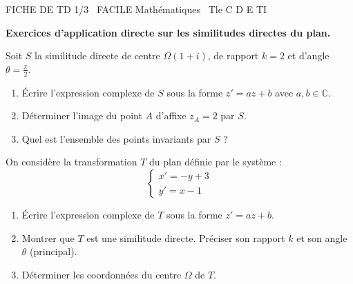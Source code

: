 \documentclass[11pt]{article}
\begin{document}
\begin{tcolorbox}[enhanced,colback=popink,colframe=popink,arc=10pt,boxrule=0pt,left=12pt,right=12pt,top=9pt,bottom=9pt]
{\color{white}\popxbold\small FICHE DE TD 1/3 \textbullet\ FACILE \hfill Mathématiques \textbullet\ Tle C D E TI\par}
\end{tcolorbox}
\vspace{4pt}
\textbf{Exercices d'application directe sur les similitudes directes du plan.}

\begin{exercice}
Soit $S$ la similitude directe de centre $\Omega(1+i)$, de rapport $k=2$ et d'angle $\theta = \frac{\pi}{2}$.
\begin{enumerate}
    \item Écrire l'expression complexe de $S$ sous la forme $z' = a z + b$ avec $a, b \in \mathbb{C}$.
    \item Déterminer l'image du point $A$ d'affixe $z_A = 2$ par $S$.
    \item Quel est l'ensemble des points invariants par $S$ ?
\end{enumerate}
\end{exercice}

\begin{exercice}
On considère la transformation $T$ du plan définie par le système :
\[
\begin{cases}
x' = -y + 3 \\
y' = x - 1
\end{cases}
\]
\begin{enumerate}
    \item Écrire l'expression complexe de $T$ sous la forme $z' = a z + b$.
    \item Montrer que $T$ est une similitude directe. Préciser son rapport $k$ et son angle $\theta$ (principal).
    \item Déterminer les coordonnées du centre $\Omega$ de $T$.
\end{enumerate}
\end{exercice}
\end{document}
